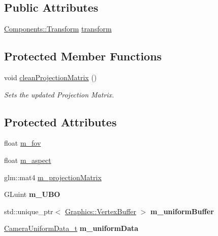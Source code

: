 \subsection*{Public Attributes}
\begin{DoxyCompactItemize}
\item 
\hyperlink{class_cookie_eng_1_1_components_1_1_transform}{Components\+::\+Transform} \hyperlink{class_cookie_eng_1_1_object_1_1_camera_aa996e685c79a71bd30e88341b68ed197}{transform}
\end{DoxyCompactItemize}
\subsection*{Protected Member Functions}
\begin{DoxyCompactItemize}
\item 
void \hyperlink{class_cookie_eng_1_1_object_1_1_camera_ab685b627f1a3bc019ae68185d41ee38b}{clean\+Projection\+Matrix} ()
\begin{DoxyCompactList}\small\item\em Sets the updated Projection Matrix. \end{DoxyCompactList}\end{DoxyCompactItemize}
\subsection*{Protected Attributes}
\begin{DoxyCompactItemize}
\item 
float \hyperlink{class_cookie_eng_1_1_object_1_1_camera_a8ec41f98d646a5c9dd733157ee41f435}{m\+\_\+fov}
\item 
float \hyperlink{class_cookie_eng_1_1_object_1_1_camera_a86c6f04a4f39bfa931493b1f6b9c013c}{m\+\_\+aspect}
\item 
glm\+::mat4 \hyperlink{class_cookie_eng_1_1_object_1_1_camera_a6a5152fd8fbd92c4cbcc73d14511e584}{m\+\_\+projection\+Matrix}
\item 
\mbox{\label{class_cookie_eng_1_1_object_1_1_camera_a58fb1802afae02fbd0cdb6d03c988f17}} 
G\+Luint {\bfseries m\+\_\+\+U\+BO}
\item 
\mbox{\label{class_cookie_eng_1_1_object_1_1_camera_a609beae2a3fb5cfca418fac357ef6d36}} 
std\+::unique\+\_\+ptr$<$ \hyperlink{class_cookie_eng_1_1_graphics_1_1_vertex_buffer}{Graphics\+::\+Vertex\+Buffer} $>$ {\bfseries m\+\_\+uniform\+Buffer}
\item 
\mbox{\label{class_cookie_eng_1_1_object_1_1_camera_a45c921e6872f0c16bc8ab742732d759c}} 
\hyperlink{struct_cookie_eng_1_1_object_1_1_camera_uniform_data__t}{Camera\+Uniform\+Data\+\_\+t} {\bfseries m\+\_\+uniform\+Data}
\end{DoxyCompactItemize}


